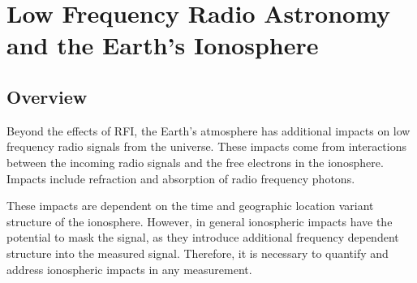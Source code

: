 \chapter{Low Frequency Radio Astronomy and the Earth's Ionosphere}\label{Ch:Iono}

\section{Overview}
Beyond the effects of RFI, the Earth's atmosphere has additional impacts on low frequency radio signals from the universe. These impacts come from interactions between the incoming radio signals and the free electrons in the ionosphere. Impacts include refraction and absorption of radio frequency photons. 

These impacts are dependent on the time and geographic location variant structure of the ionosphere. However, in general ionospheric impacts have the potential to mask the \cm signal, as they introduce additional frequency dependent structure into the measured signal. Therefore, it is necessary to quantify and address ionospheric impacts in any \cm measurement. 


